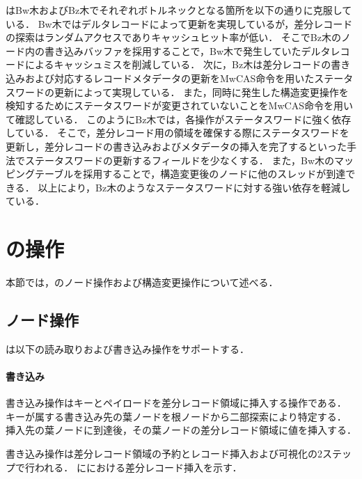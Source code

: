 \Bctree{}はBw木およびBz木でそれぞれボトルネックとなる箇所を以下の通りに克服している．
Bw木ではデルタレコードによって更新を実現しているが，差分レコードの探索はランダムアクセスでありキャッシュヒット率が低い．
そこでBz木のノード内の書き込みバッファを採用することで，Bw木で発生していたデルタレコードによるキャッシュミスを削減している．
次に，Bz木は差分レコードの書き込みおよび対応するレコードメタデータの更新をMwCAS命令を用いたステータスワードの更新によって実現している．
また，同時に発生した構造変更操作を検知するためにステータスワードが変更されていないことをMwCAS命令を用いて確認している．
このようにBz木では，各操作がステータスワードに強く依存している．
そこで，差分レコード用の領域を確保する際にステータスワードを更新し，差分レコードの書き込みおよびメタデータの挿入を完了するといった手法でステータスワードの更新するフィールドを少なくする．
また，Bw木のマッピングテーブルを採用することで，構造変更後のノードに他のスレッドが到達できる．
以上により，Bz木のようなステータスワードに対する強い依存を軽減している．

\section{\Bctree{}の操作}
\label{sec:bc_tree_operation}

本節では，\Bctree{}のノード操作および構造変更操作について述べる．

\subsection{ノード操作}

\Bctree{}は以下の読み取りおよび書き込み操作をサポートする．

\paragraph{書き込み}

書き込み操作はキーとペイロードを差分レコード領域に挿入する操作である．
キーが属する書き込み先の葉ノードを根ノードから二部探索により特定する．
挿入先の葉ノードに到達後，その葉ノードの差分レコード領域に値を挿入する．

書き込み操作は差分レコード領域の予約とレコード挿入および可視化の2ステップで行われる．
\Fig{\ref{fig:bc_tree_insertion}}に\Bctree{}における差分レコード挿入を示す．

